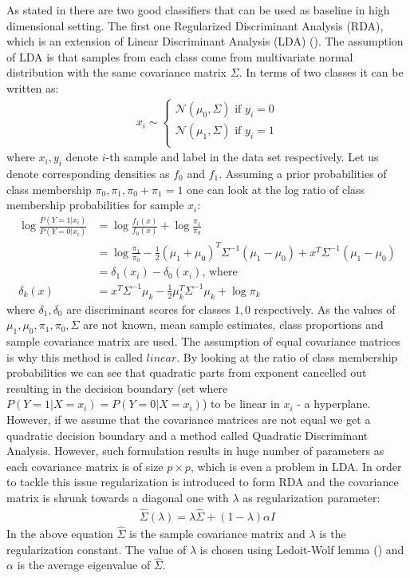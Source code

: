 \documentclass[12pt, wide]{mwart}
\begin{document}
As stated in \cite[chapter 18.2]{ESL2} there are two good classifiers that can be used as baseline in high dimensional setting. The first one Regularized Discriminant Analysis (RDA), which is an extension of Linear Discriminant Analysis (LDA) (\cite[chapter 4.3]{ESL2}). The assumption of LDA is that samples from each class come from multivariate normal distribution with the same covariance matrix $\Sigma$. In terms of two classes it can be written as:
\begin{align*}
    x_i \sim \begin{cases}
    \mathcal{N}(\mu_0, \Sigma) \text{  if $y_i=0$} \\
    \mathcal{N}(\mu_1, \Sigma) \text{  if $y_i=1$} \\
    \end{cases}
\end{align*}
where $x_i, y_i$ denote $i$-th sample and label in the data set respectively. Let us denote corresponding densities as $f_0$ and $f_1$. Assuming a prior probabilities of class membership $\pi_0, \pi_1, \pi_0 + \pi_1=1$ one can look at the log ratio of class membership probabilities for sample $x_i$:
\begin{align} 
\log \frac{P(Y=1 | x_i)}{P(Y=0 | x_i)}&=\log \frac{f_1(x)}{f_{0}(x)}+\log \frac{\pi_1}{\pi_{0}} \nonumber \\&=\log \frac{\pi_1}{\pi_{0}}-\frac{1}{2}\left(\mu_1+\mu_{0}\right)^{T} \Sigma^{-1}\left(\mu_1-\mu_{0}\right) + x^{T} \Sigma^{-1}\left(\mu_1-\mu_{0}\right) \nonumber\\ &= \delta_1(x_i) - \delta_0(x_i) \text{, where} \nonumber\\
\delta_{k}(x)&=x^{T} \Sigma^{-1} \mu_{k}-\frac{1}{2} \mu_{k}^{T} \Sigma^{-1} \mu_{k}+\log \pi_{k} \label{eq:dslda}
\end{align}
where $\delta_1, \delta_0$ are discriminant scores for classes $1,0$ respectively. As the values of $\mu_1, \mu_0, \pi_1, \pi_0, \Sigma$ are not known, mean sample estimates, class proportions and sample covariance matrix are used. The assumption of equal covariance matrices is why this method is called $linear$. By looking at the ratio of class membership probabilities we can see that quadratic parts from exponent cancelled out resulting in the decision boundary (set where $P(Y=1 | X=x_i) = P(Y=0 | X=x_i)$) to be linear in $x_i$ - a hyperplane. However, if we assume that the covariance matrices are not equal we get a quadratic decision boundary and a method called Quadratic Discriminant Analysis. However, such formulation results in huge number of parameters as each covariance matrix is of size $p \times p$, which is even a problem in LDA. In order to tackle this issue regularization is introduced to form RDA and the covariance matrix is shrunk towards a diagonal one with $\lambda$ as regularization parameter:
\begin{align*}
    \hat{\Sigma}(\lambda)=\lambda \hat{\Sigma}+(1-\lambda) \alpha I
\end{align*}
In the above equation $\hat{\Sigma}$ is the sample covariance matrix and $\lambda$ is the regularization constant. The value of $\lambda$ is chosen using Ledoit-Wolf lemma (\cite{honey}) and $\alpha$ is the average eigenvalue of $\hat{\Sigma}$.
\end{document}

